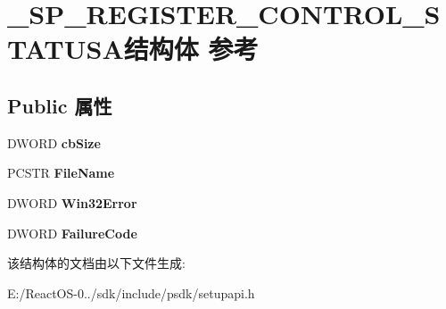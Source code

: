 \hypertarget{struct___s_p___r_e_g_i_s_t_e_r___c_o_n_t_r_o_l___s_t_a_t_u_s_a}{}\section{\+\_\+\+S\+P\+\_\+\+R\+E\+G\+I\+S\+T\+E\+R\+\_\+\+C\+O\+N\+T\+R\+O\+L\+\_\+\+S\+T\+A\+T\+U\+S\+A结构体 参考}
\label{struct___s_p___r_e_g_i_s_t_e_r___c_o_n_t_r_o_l___s_t_a_t_u_s_a}
\subsection*{Public 属性}
\begin{DoxyCompactItemize}
\item 
\mbox{\label{struct___s_p___r_e_g_i_s_t_e_r___c_o_n_t_r_o_l___s_t_a_t_u_s_a_a1efa8d13e748d07353ef06ef4035bc81}} 
D\+W\+O\+RD {\bfseries cb\+Size}
\item 
\mbox{\label{struct___s_p___r_e_g_i_s_t_e_r___c_o_n_t_r_o_l___s_t_a_t_u_s_a_a2251312d6ee4c5ba1136e6f289ed18bc}} 
P\+C\+S\+TR {\bfseries File\+Name}
\item 
\mbox{\label{struct___s_p___r_e_g_i_s_t_e_r___c_o_n_t_r_o_l___s_t_a_t_u_s_a_ac6690350d2b2bac8be33b05027d54416}} 
D\+W\+O\+RD {\bfseries Win32\+Error}
\item 
\mbox{\label{struct___s_p___r_e_g_i_s_t_e_r___c_o_n_t_r_o_l___s_t_a_t_u_s_a_a2fcf7c1f3ceacf54f35f2b790abb6bdf}} 
D\+W\+O\+RD {\bfseries Failure\+Code}
\end{DoxyCompactItemize}


该结构体的文档由以下文件生成\+:\begin{DoxyCompactItemize}
\item 
E\+:/\+React\+O\+S-\/0../sdk/include/psdk/setupapi.\+h\end{DoxyCompactItemize}

